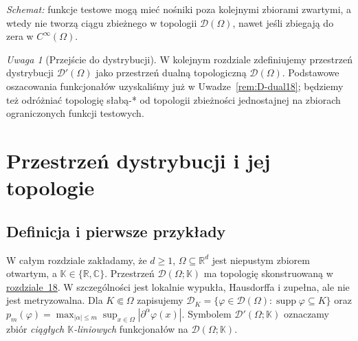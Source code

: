 \documentclass[11pt,a4paper]{article}
\numberwithin{equation}{section}
\theoremstyle{plain}
\theoremstyle{definition}
\theoremstyle{remark}
\newtheorem{uwaga}[twierdzenie]{Uwaga}
\newcommand{\R}{\mathbb R}
\newcommand{\C}{\mathbb C}
\newcommand{\K}{\mathbb K}
\DeclareMathOperator{\supp}{supp}
\begin{document}
\begin{center}

\small\emph{Schemat:} funkcje testowe mogą mieć nośniki poza
kolejnymi zbiorami zwartymi, a wtedy nie tworzą ciągu zbieżnego
w topologii $\mathcal D(\Omega)$, nawet jeśli zbiegają do zera
w $C^\infty(\Omega)$.
\end{center}

\begin{uwaga}[Przejście do dystrybucji]
\label{rem:D-distributions-next18}
W kolejnym rozdziale zdefiniujemy przestrzeń dystrybucji
$\mathcal D'(\Omega)$ jako przestrzeń dualną topologiczną
$\mathcal D(\Omega)$. Podstawowe oszacowania funkcjonałów
uzyskaliśmy już w Uwadze~\ref{rem:D-dual18}; będziemy też
odróżniać topologię słabą-* od topologii zbieżności
jednostajnej na zbiorach ograniczonych funkcji testowych.
\end{uwaga}


\setcounter{section}{18}
\section{Przestrzeń dystrybucji i jej topologie}
\label{sec:dystrybucje19}

\subsection{Definicja i pierwsze przykłady}

W całym rozdziale zakładamy, że $d\ge1$, $\Omega\subseteq\R^d$
jest niepustym zbiorem otwartym, a $\K\in\{\R,\C\}$.
Przestrzeń $\mathcal D(\Omega;\K)$ ma topologię skonstruowaną
w \hyperref[sec:funkcje-testowe18]{rozdziale~18}. W szczególności
jest lokalnie wypukła, Hausdorffa i zupełna, ale nie jest
metryzowalna. Dla $K\Subset\Omega$ zapisujemy
$\mathcal D_K=\{\varphi\in\mathcal D(\Omega):\supp\varphi\subseteq K\}$
oraz $p_m(\varphi)=\max_{|\alpha|\le m}\sup_{x\in\Omega}
|\partial^\alpha\varphi(x)|$. Symbolem $\mathcal D'(\Omega;\K)$
oznaczamy zbiór \emph{ciągłych $\K$-liniowych} funkcjonałów
na $\mathcal D(\Omega;\K)$.
\end{document}
